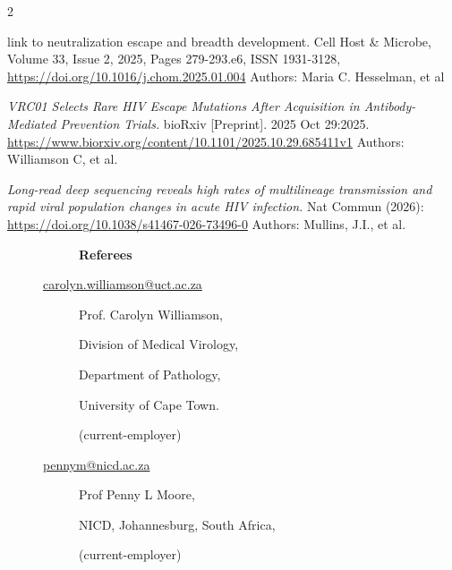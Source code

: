 \documentclass[12pt]{article}
\begin{document}
\begin{multicols}{2}
\begin{description}
\begin{description}
{         link to neutralization escape and breadth development.} 
         Cell Host \& Microbe, Volume 33, Issue 2, 2025, Pages 279-293.e6,
	ISSN 1931-3128, 
         \url{https://doi.org/10.1016/j.chom.2025.01.004}
         Authors:  Maria C. Hesselman, et al
 \item[2025:]
	{\it VRC01 Selects Rare HIV Escape Mutations After Acquisition in Antibody-Mediated Prevention Trials.}
	bioRxiv [Preprint]. 2025 Oct 29:2025.
	\url{https://www.biorxiv.org/content/10.1101/2025.10.29.685411v1}
	Authors: Williamson C, et al.  
 \item[2026:]
         {\it Long-read deep sequencing reveals high rates of multilineage transmission 
         and rapid viral population changes in acute HIV infection.} 
         Nat Commun (2026): 
         \url{https://doi.org/10.1038/s41467-026-73496-0}
         Authors:  Mullins, J.I., et al.



\end{description}
\end{description}




\begin{description}\item[] \begin{description}\item[] {\large \bf  Referees  }
\newline
\item[\url{carolyn.williamson@uct.ac.za}] 
 \item[] Prof. Carolyn Williamson, 
 \item[] Division of Medical Virology, 
 \item[] Department of Pathology, 
 \item[] University of Cape Town.
\item[] (current-employer)
\item[]

\item[\url{pennym@nicd.ac.za}] 
 \item[] Prof Penny L Moore,
 \item[] NICD, Johannesburg, South Africa,
 \item[] (current-employer) 
\item[]

 \end{description}
\end{description}

\end{multicols}
\end{document}
